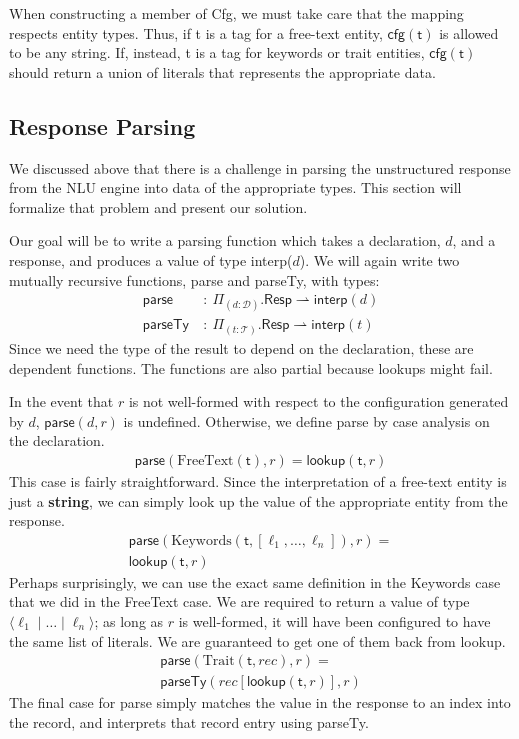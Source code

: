 \documentclass[twocolumn]{article}
\newcommand{\fcy}[1]{\mathcal{#1}}
\newcommand{\etag}[1]{\textsf{#1}}
\newcommand{\ff}[1]{\textsf{#1}}
\begin{document}
When constructing a member of \ff{Cfg}, we must take care that the mapping
respects entity types. Thus, if \etag{t} is a tag for a free-text entity,
$\ff{cfg}(\etag{t})$ is allowed to be any string. If, instead, \etag{t} is a tag
for keywords or trait entities, $\ff{cfg}(\etag{t})$ should return a union of
literals that represents the appropriate data.

\subsection{Response Parsing}
We discussed above that there is a challenge in parsing the unstructured
response from the NLU engine into data of the appropriate types. This section
will formalize that problem and present our solution.

Our goal will be to write a parsing function which takes a declaration, $d$, and
a response, and produces a value of type \ff{interp}($d$). We will again write
two mutually recursive functions, \ff{parse} and \ff{parseTy}, with types:
\begin{align*}
\ff{parse}\ &:\ \Pi_{(d : \fcy{D})}. \textsf{Resp} \rightharpoonup \ff{interp}(d) \\
\ff{parseTy}\ &:\ \Pi_{(t : \fcy{T})}. \textsf{Resp} \rightharpoonup \ff{interp}(t)
\end{align*}
Since we need the type of the result to depend on the declaration, these are
dependent functions. The functions are also partial because lookups might fail.

In the event that $r$ is not well-formed with respect to the configuration
generated by $d$, $\ff{parse}(d, r)$ is undefined. Otherwise, we define
\ff{parse} by case analysis on the declaration.
\begin{align*}
  \ff{parse}(\text{FreeText}(\etag{t}), r) = \ff{lookup}(\etag{t}, r)
\end{align*}
This case is fairly straightforward. Since the interpretation of a free-text
entity is just a {\bf string}, we can simply look up the value of the
appropriate entity from the response.
\begin{align*}
  \ff{parse}(\text{Keywords}(\etag{t}, [\ell_1, \dots, \ell_n]), r) =\\
  \ff{lookup}(\etag{t}, r)
\end{align*}
Perhaps surprisingly, we can use the exact same definition in the Keywords case
that we did in the FreeText case. We are required to return a value of type
$\langle {\ell_1 \mid \dots \mid \ell_n} \rangle$; as long as $r$ is
well-formed, it will have been configured to have the same list of literals. We
are guaranteed to get one of them back from \ff{lookup}.
\begin{align*}
  \ff{parse}(\text{Trait}(\etag{t}, rec), r) = \\
  \ff{parseTy}(rec[\ff{lookup}(\etag{t}, r)], r)
\end{align*}
The final case for \ff{parse} simply matches the value in the response to an
index into the record, and interprets that record entry using \ff{parseTy}.
\end{document}
